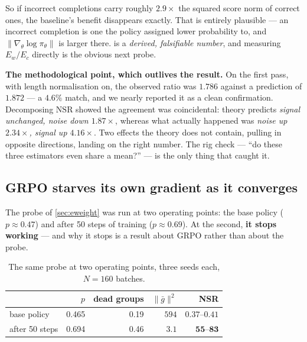 \documentclass[11pt,letterpaper]{article}
\theoremstyle{definition}
\newcommand{\pol}{\pi_\theta}
\newcommand{\grad}{\nabla_\theta}
\newcommand{\nsr}{\mathrm{NSR}}
\begin{document}
So if incorrect completions carry roughly $2.9\times$ the squared score norm of correct ones, the
baseline's benefit disappears exactly. That is entirely plausible --- an incorrect completion is one
the policy assigned lower probability to, and $\|\grad\log\pol\|$ is larger there.  is a
\emph{derived, falsifiable number}, and measuring $E_w/E_c$ directly is the obvious next probe.

\begin{aside}
\textbf{The methodological point, which outlives the result.} On the first pass, with length
normalisation on, the observed ratio was $1.786$ against a prediction of $1.872$ --- a $4.6\%$ match,
and we nearly reported it as a clean confirmation. Decomposing $\nsr$ showed the agreement was
coincidental: theory predicts \emph{signal unchanged, noise down $1.87\times$}, whereas what actually
happened was \emph{noise up $2.34\times$, signal up $4.16\times$}. Two effects the theory does not
contain, pulling in opposite directions, landing on the right number. The rig check --- ``do these
three estimators even share a mean?'' --- is the only thing that caught it.
\end{aside}


\subsection{GRPO starves its own gradient as it converges}
\label{sec:underpowered}

The probe of \cref{sec:eweight} was run at two operating points: the base policy ($p \approx 0.47$)
and after 50 steps of training ($p \approx 0.69$). At the second, \textbf{it stops working} --- and
why it stops is a result about GRPO rather than about the probe.

\begin{table}[H]
\centering
\caption{The same probe at two operating points, three seeds each, $N=160$ batches.}
\label{tab:underpowered}
\small
\begin{tabular}{@{}lrrrr@{}}
\toprule
& \textbf{$p$} & \textbf{dead groups} & \textbf{$\|\bar{g}\|^2$} & \textbf{NSR} \\
\midrule
base policy      & 0.465 & 0.19 & $594$ & $0.37$--$0.41$ \\
after 50 steps   & 0.694 & 0.46 & $3.1$ & $\mathbf{55}$--$\mathbf{83}$ \\
\bottomrule
\end{tabular}
\end{table}
\end{document}
